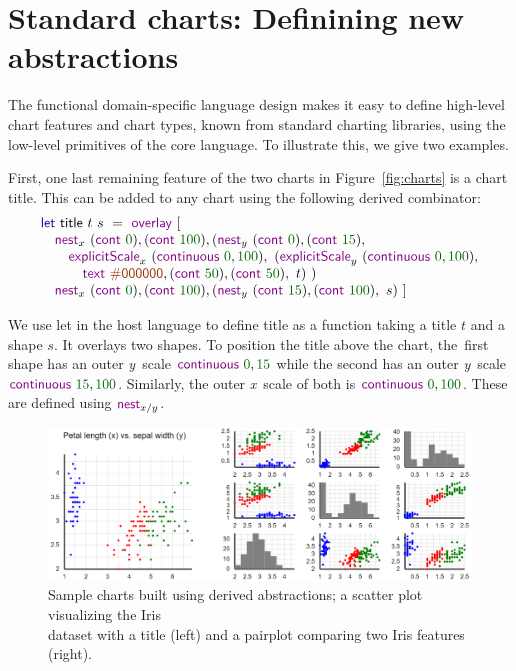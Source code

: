 \documentclass{jfp}
\newcommand{\X}{\emph{x}\ }
\newcommand{\Y}{\emph{y}\ }
\newcommand{\num}[1]{\textcolor{numclr}{#1}}
\newcommand{\strf}[1]{\textnormal{\textcolor{strclr}{\sffamily #1}}}
\newcommand{\ident}[1]{\textnormal{\textcolor{idclr}{\sffamily #1}}}
\newcommand{\kvd}[1]{\textnormal{\textcolor{kvdclr}{\sffamily #1}}}
\newcommand{\fkvd}[1]{\textnormal{\textcolor{fkvdclr}{\sffamily #1}}}
\begin{document}
\section{Standard charts: Definining new abstractions}
\label{sec:abstractions}

The functional domain-specific language design makes it easy to define high-level chart features
and chart types, known from standard charting libraries, using the low-level primitives of the
core language. To illustrate this, we give two examples.

First, one last remaining feature of the two charts in Figure~\ref{fig:charts} is a chart title.
This can be added to any chart using the following derived combinator:
%
\begin{equation*}
\begin{array}{l}
\fkvd{let}~\ident{title}~t~s~=\kvd{overlay}~[\\
\quad \kvd{nest}_x~(\kvd{cont}~\num{0}), (\kvd{cont}~\num{100}),
  (\kvd{nest}_y~(\kvd{cont}~\num{0}), (\kvd{cont}~\num{15}), \\
\quad\quad \kvd{explicitScale}_x~(\kvd{continuous}~\num{0},\num{100}),~(\kvd{explicitScale}_y~(\kvd{continuous}~\num{0},\num{100}),\\
\quad\qquad \kvd{text}~\strf{\#000000}, (\kvd{cont}~\num{50}), (\kvd{cont}~\num{50}),~t)~)\\
\quad \kvd{nest}_x~(\kvd{cont}~\num{0}), (\kvd{cont}~\num{100}),
  (\kvd{nest}_y~(\kvd{cont}~\num{15}), (\kvd{cont}~\num{100}),~s)~]
\end{array}
\end{equation*}

\vspace{-0.5em}
\noindent
We use \fkvd{let} in the host language to define \ident{title} as a function taking a title $t$ and
a shape $s$. It overlays two shapes. To position the title above the chart, the~first
shape has an outer \Y scale $\kvd{continuous}~\num{0},\num{15}$ while the second has an outer \Y scale
$\kvd{continuous}~\num{15},\num{100}$. Similarly, the outer \X scale of both is $\kvd{continuous}~\num{0},\num{100}$.
These are defined using $\kvd{nest}_{x/y}$.

\begin{figure}
  \includegraphics[scale=0.57]{figures/standard}
  \vspace{0.25em}
  \caption{Sample charts built using derived abstractions; a scatter plot visualizing the Iris\\
    dataset with a title (left) and a pairplot comparing two Iris features (right).}
  \label{fig:standard}
\end{figure}
\end{document}
